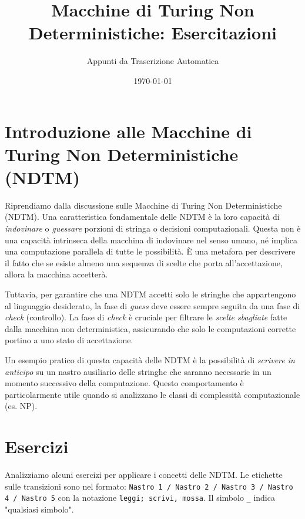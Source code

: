 \documentclass[a4paper]{article}
\title{Macchine di Turing Non Deterministiche: Esercitazioni}
\author{Appunti da Trascrizione Automatica}
\date{\today}
\theoremstyle{definition} %
\begin{document}


\maketitle
\tableofcontents
\newpage

\section{Introduzione alle Macchine di Turing Non Deterministiche (NDTM)}

Riprendiamo dalla discussione sulle Macchine di Turing Non Deterministiche (NDTM).
Una caratteristica fondamentale delle NDTM è la loro capacità di \textit{indovinare} o \textit{guessare} porzioni di stringa o decisioni computazionali. Questa non è una capacità intrinseca della macchina di indovinare nel senso umano, né implica una computazione parallela di tutte le possibilità. È una metafora per descrivere il fatto che se esiste almeno una sequenza di scelte che porta all'accettazione, allora la macchina accetterà.

Tuttavia, per garantire che una NDTM accetti solo le stringhe che appartengono al linguaggio desiderato, la fase di \textit{guess} deve essere sempre seguita da una fase di \textit{check} (controllo). La fase di \textit{check} è cruciale per filtrare le \textit{scelte sbagliate} fatte dalla macchina non deterministica, assicurando che solo le computazioni corrette portino a uno stato di accettazione.

Un esempio pratico di questa capacità delle NDTM è la possibilità di \textit{scrivere in anticipo} su un nastro ausiliario delle stringhe che saranno necessarie in un momento successivo della computazione. Questo comportamento è particolarmente utile quando si analizzano le classi di complessità computazionale (es. NP).

\section{Esercizi}

Analizziamo alcuni esercizi per applicare i concetti delle NDTM. Le etichette sulle transizioni sono nel formato:
\texttt{Nastro 1 / Nastro 2 / Nastro 3 / Nastro 4 / Nastro 5}
con la notazione \texttt{leggi; scrivi, mossa}. Il simbolo \texttt{\_} indica "qualsiasi simbolo".
\end{document}
